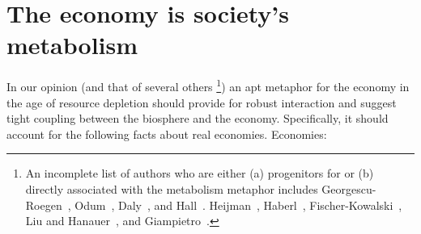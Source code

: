 \section{The economy is society's metabolism}
\label{sec:economy_metabolism}

In our opinion (and that of several others%
	\footnote{\label{fn:metabolism_authors}
	An incomplete list of authors who are either
	(a) progenitors for 
	or
	(b) directly associated with the metabolism metaphor includes
	Georgescu-Roegen~\cite{Georgescu-Roegen:1971aa},
	Odum~\cite{Odum:1973aa},
	Daly~\cite{Daly1977}, and
	Hall~\cite{Hall1986}.
	Heijman~\cite{Heijman:1988aa},
	Haberl~\cite{Haberl2001}, 
	Fischer-Kowalski~\cite{F-K1999}, 
	Liu and Hanauer~\cite{Liu2012}, and
	Giampietro~\cite{Giampietro2000}.
	})
an apt metaphor for the economy in the age of resource depletion
should provide for robust interaction
and suggest tight coupling between the biosphere and the economy.
Specifically, it should account for the following facts about real economies. 
Economies:


